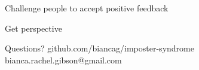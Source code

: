 \documentclass[aspectratio=169]{beamer}
\begin{document}
\begin{frame}
  \begin{center}
    \Huge Challenge people to accept positive feedback
  \end{center}
\end{frame}

\begin{frame}
  \begin{center}
    \Huge Get perspective
    \small
  \end{center}
\end{frame}

\begin{frame}
  \begin{center}
    \Huge Questions?
    github.com/biancag/imposter-syndrome
    bianca.rachel.gibson@gmail.com
  \end{center}
\end{frame}

\begin{frame}
  

  
\end{frame}
\end{document}

